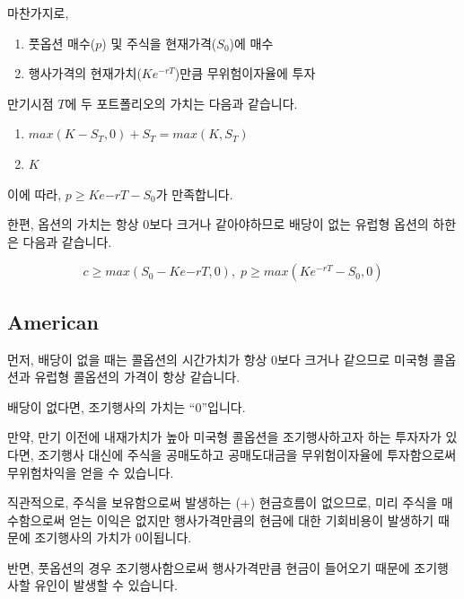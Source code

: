 \documentclass[
  letterpaper,
  DIV=11,
  numbers=noendperiod]{scrreprt}
\providecommand{\tightlist}{%
  \setlength{\itemsep}{0pt}\setlength{\parskip}{0pt}}\usepackage{longtable,booktabs,array}
\begin{document}
마찬가지로,

\begin{enumerate}
\def\labelenumi{\arabic{enumi}.}
\tightlist
\item
  풋옵션 매수(\(p\)) 및 주식을 현재가격(\(S_0\))에 매수
\item
  행사가격의 현재가치(\(Ke^{-rT}\))만큼 무위험이자율에 투자
\end{enumerate}

만기시점 \(T\)에 두 포트폴리오의 가치는 다음과 같습니다.

\begin{enumerate}
\def\labelenumi{\arabic{enumi}.}
\tightlist
\item
  \(max(K-S_T,0)+S_T=max(K,S_T)\)
\item
  \(K\)
\end{enumerate}

이에 따라, \(p\geq Ke{-rT}-S_0\)가 만족합니다.

한편, 옵션의 가치는 항상 0보다 크거나 같아야하므로 배당이 없는 유럽형
옵션의 하한은 다음과 같습니다.

\[c\geq max(S_0-Ke{-rT},0),\;p\geq max(Ke^{-rT}-S_0,0)\]

\subsection*{American}\label{american}

먼저, 배당이 없을 때는 콜옵션의 시간가치가 항상 0보다 크거나 같으므로
미국형 콜옵션과 유럽형 콜옵션의 가격이 항상 같습니다.

\begin{tcolorbox}[enhanced jigsaw, titlerule=0mm, bottomtitle=1mm, left=2mm, title=\textcolor{quarto-callout-tip-color}{\faLightbulb}\hspace{0.5em}{Tip}, toptitle=1mm, bottomrule=.15mm, colframe=quarto-callout-tip-color-frame, breakable, opacityback=0, rightrule=.15mm, opacitybacktitle=0.6, coltitle=black, colback=white, arc=.35mm, colbacktitle=quarto-callout-tip-color!10!white, toprule=.15mm, leftrule=.75mm]

배당이 없다면, 조기행사의 가치는 ``0''입니다.

만약, 만기 이전에 내재가치가 높아 미국형 콜옵션을 조기행사하고자 하는
투자자가 있다면, 조기행사 대신에 주식을 공매도하고 공매도대금을
무위험이자율에 투자함으로써 무위험차익을 얻을 수 있습니다.

직관적으로, 주식을 보유함으로써 발생하는 (+) 현금흐름이 없으므로, 미리
주식을 매수함으로써 얻는 이익은 없지만 행사가격만큼의 현금에 대한
기회비용이 발생하기 때문에 조기행사의 가치가 0이됩니다.

반면, 풋옵션의 경우 조기행사함으로써 행사가격만큼 현금이 들어오기 때문에
조기행사할 유인이 발생할 수 있습니다.

\end{tcolorbox}
\end{document}
